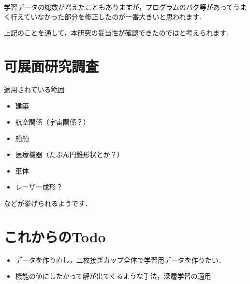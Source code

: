 \documentclass[11pt]{jsarticle}
\begin{document}
			学習データの総数が増えたこともありますが，プログラムのバグ等があってうまく行えていなかった部分を修正したのが一番大きいと思われます．
			
			上記のことを通して，本研究の妥当性が確認できたのではと考えられます．
	\section{可展面研究調査}
		適用されている範囲
			\begin{itemize}
				\item 建築
				\item 航空関係（宇宙関係？）
				\item 船舶
				\item 医療機器（たぶん円錐形状とか？）
				\item 車体
				\item レーザー成形？
			\end{itemize}
		などが挙げられるようです．		
		
	\section{これからのTodo}
			\begin{itemize}
				\item データを作り直し，二枚接ぎカップ全体で学習用データを作りたい．
				\item 機能の値にしたがって解が出てくるような手法，深層学習の適用
			\end{itemize}
			
	\newpage
\vspace{10cm}
	

\vspace{14cm}
	\articleSPRfour
	\articleSPRfive
\end{document}
